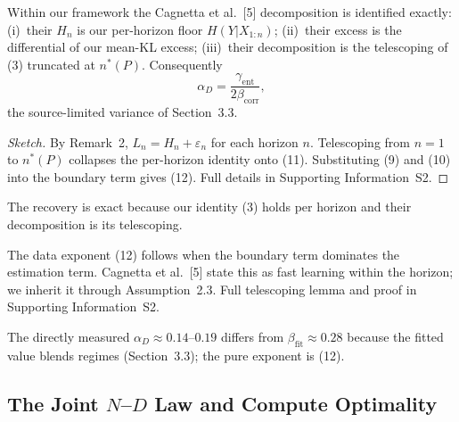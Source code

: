 \documentclass[entropy,article,submit,moreauthors,pdftex]{mdpi}
\newcommand{\eps}{\varepsilon}
\begin{document}
\begin{theorem}
\label{thm:recovery}
Within our framework the Cagnetta et al.\ [5] decomposition is identified exactly:
(i)~their $H_n$ is our per-horizon floor $H(Y|X_{1:n})$; (ii)~their excess is
the differential of our mean-KL excess; (iii)~their decomposition is the
telescoping of (3) truncated at $n^*(P)$.  Consequently
\begin{equation}
  \alpha_D=\frac{\gamma_{\mathrm{ent}}}{2\beta_{\mathrm{corr}}},
  \label{eq:alphaD}
\end{equation}
the source-limited variance of Section~3.3.
\end{theorem}

\begin{proof}[Sketch]
By Remark~2, $L_n=H_n+\eps_n$ for each horizon $n$.
Telescoping from $n=1$ to $n^*(P)$ collapses the per-horizon identity onto
(11).  Substituting (9) and (10)
into the boundary term gives (12).  Full details in
Supporting Information~S2.
\end{proof}

The recovery is exact because our identity (3) holds per
horizon and their decomposition is its telescoping.

\begin{remark}
\label{rem:dominance}
The data exponent (12) follows when the boundary term dominates
the estimation term.  Cagnetta et al.\ [5] state this as fast learning within the
horizon; we inherit it through Assumption~2.3.  Full
telescoping lemma and proof in Supporting Information~S2.
\end{remark}

\begin{remark}
\label{rem:discrepancy}
The directly measured $\alpha_D\!\approx\!0.14$--$0.19$ differs from
$\beta_{\mathrm{fit}}\!\approx\!0.28$ because the fitted value blends regimes
(Section~3.3); the pure exponent is (12).
\end{remark}

\subsection{The Joint $N$--$D$ Law and Compute Optimality}
\label{sec:joint}
\end{document}
